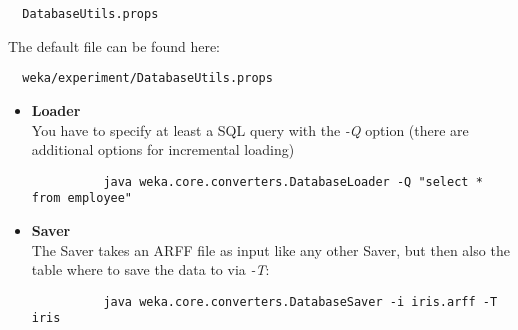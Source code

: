 \begin{verbatim}
  DatabaseUtils.props
\end{verbatim}

\noindent The default file can be found here:
\begin{verbatim}
  weka/experiment/DatabaseUtils.props
\end{verbatim}

\begin{itemize}
	\item \textbf{Loader} \\
		You have to specify at least a SQL query with the \textit{-Q} option (there are additional options for incremental loading)
		\begin{verbatim}
		  java weka.core.converters.DatabaseLoader -Q "select * from employee"
		\end{verbatim}
	\item \textbf{Saver} \\
		The Saver takes an ARFF file as input like any other Saver, but then also the table where to save the data to via \textit{-T}:
		\begin{verbatim}
 		  java weka.core.converters.DatabaseSaver -i iris.arff -T iris
		\end{verbatim}
\end{itemize}
